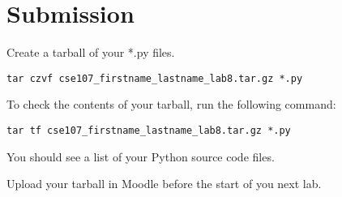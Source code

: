 \documentclass[12pt]{article}
\begin{document}

\section*{Submission}

Create a tarball of your *.py files.

\begin{lstlisting}[style=bash]
tar czvf cse107_firstname_lastname_lab8.tar.gz *.py
\end{lstlisting}


To check the contents of your tarball, run the following command:

\begin{lstlisting}[style=bash]
tar tf cse107_firstname_lastname_lab8.tar.gz *.py
\end{lstlisting}

You should see a list of your Python source code files.

Upload your tarball in Moodle before the start of you next lab.
\end{document}

